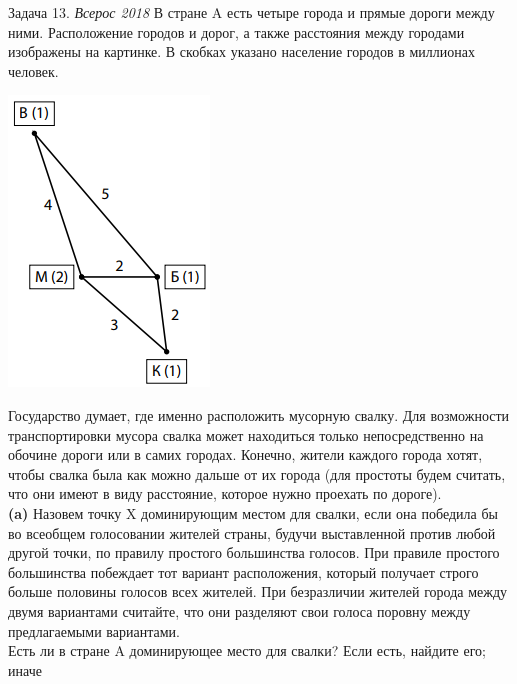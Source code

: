 \begin{mybox}{Задача 13. \textit{Всерос 2018}}
    \indent\setlength{\parindent}{1em}\indent\setlength{\parindent}{1em}В стране A есть четыре города и прямые дороги
    между ними. Расположение городов и дорог, а также расстояния между городами изображены на картинке. В скобках
    указано население городов в миллионах человек.
    \begin{center}
        \includegraphics[width=0.5\linewidth]{static/4_12}
    \end{center}
    \indent\setlength{\parindent}{1em}\indent\setlength{\parindent}{1em}Государство думает, где именно расположить
    мусорную свалку. Для возможности транспортировки мусора свалка может находиться только непосредственно на обочине
    дороги или в самих городах. Конечно, жители каждого города хотят, чтобы свалка была как можно дальше от их города
    (для простоты будем считать, что они имеют в виду расстояние, которое нужно проехать по дороге).\smallskip\\
    \indent\setlength{\parindent}{1em}\textbf{(a)} Назовем точку X доминирующим местом для свалки, если она победила
    бы во всеобщем голосовании жителей страны, будучи выставленной против любой другой точки, по правилу простого
    большинства голосов. При правиле простого большинства побеждает тот вариант расположения, который получает строго
    больше половины голосов всех жителей. При безразличии жителей города между двумя вариантами считайте, что они
    разделяют свои голоса поровну между предлагаемыми вариантами.\smallskip\\
    \indent\setlength{\parindent}{1em}Есть ли в стране A доминирующее место для свалки? Если есть, найдите его; иначе

\end{mybox}
